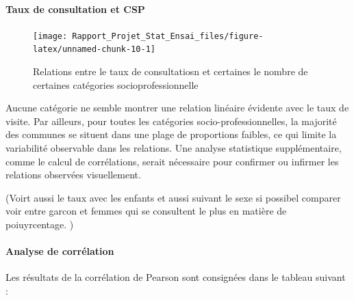 \documentclass[
]{article}
\begin{document}
\paragraph{Taux de consultation et
CSP}\label{taux-de-consultation-et-csp}

\begin{figure}

{\centering \texttt{[image: Rapport\_Projet\_Stat\_Ensai\_files/figure-latex/unnamed-chunk-10-1]} 

}

\caption{Relations entre le taux de consultatiosn et certaines le nombre de certaines catégories socioprofessionnelle}\label{fig:unnamed-chunk-10}
\end{figure}

Aucune catégorie ne semble montrer une relation linéaire évidente avec
le taux de visite. Par ailleurs, pour toutes les catégories
socio-professionnelles, la majorité des communes se situent dans une
plage de proportions faibles, ce qui limite la variabilité observable
dans les relations. Une analyse statistique supplémentaire, comme le
calcul de corrélations, serait nécessaire pour confirmer ou infirmer les
relations observées visuellement.

(Voirt aussi le taux avec les enfants et aussi suivant le sexe si
possibel comparer voir entre garcon et femmes qui se consultent le plus
en matière de poiuyrcentage. )

\paragraph{Analyse de corrélation}\label{analyse-de-corruxe9lation}

Les résultats de la corrélation de Pearson sont consignées dans le
tableau suivant :
\end{document}
